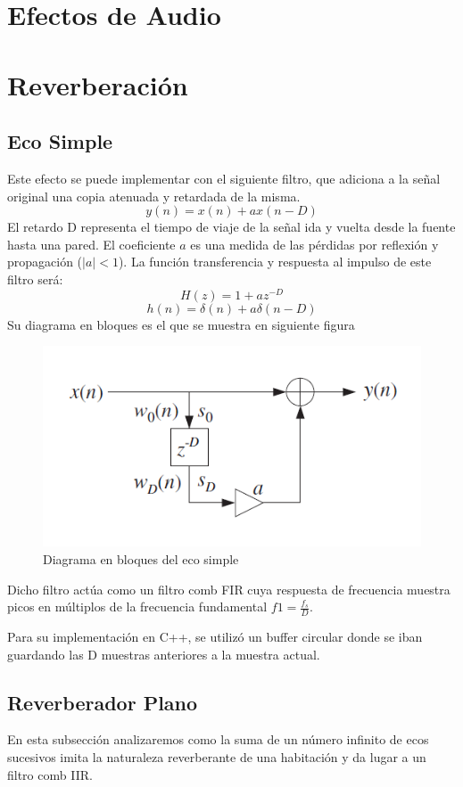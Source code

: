 \documentclass{report}
\begin{document}
\section*{Efectos de Audio}
\section*{Reverberaci\'{o}n}

\subsection*{Eco Simple}
Este efecto se puede implementar con el siguiente filtro, que adiciona a la se\~{n}al original una copia atenuada y retardada de la misma.
$$y(n)=x(n)+ax(n-D)$$
El retardo D representa el tiempo de viaje de la se\~{n}al ida y vuelta desde la fuente hasta una pared. El coeficiente $a$ es una medida de las pérdidas por reflexión y propagación ($|a|<1$).
La funci\'{o}n transferencia y respuesta al impulso de este filtro ser\'{a}:
$$H(z)=1+az^{-D}$$
$$h(n)=\delta(n)+a\delta(n-D)$$
Su diagrama en bloques es el que se muestra en siguiente figura

\begin{figure}[h]
  \centering
    \includegraphics[scale=1]{imagenes/diag_eco_simple.png}
  \caption{ Diagrama en bloques del eco simple}
  \label{fig:SI}
\end{figure}

Dicho filtro actúa como un filtro comb FIR cuya respuesta de frecuencia muestra picos en
múltiplos de la frecuencia fundamental $f1 = \frac{f_s}{D}$.

Para su implementaci\'{o}n en C++, se utiliz\'{o} un buffer circular donde se iban guardando las D muestras anteriores a la muestra actual. 

\subsection*{Reverberador Plano}
En esta subsecci\'{o}n analizaremos como la suma de un número infinito de ecos sucesivos imita la naturaleza reverberante
de una habitación y da lugar a un filtro comb IIR. 
\end{document}
